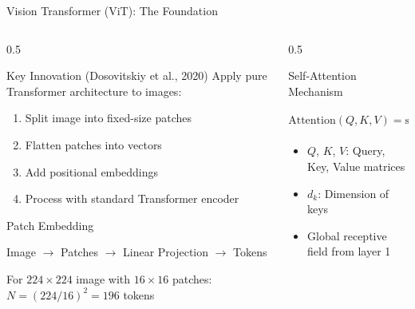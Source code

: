 \documentclass[aspectratio=169]{beamer}
\begin{document}
\begin{frame}{Vision Transformer (ViT): The Foundation}
    \begin{columns}
        \begin{column}{0.5\textwidth}
            \begin{block}{Key Innovation (Dosovitskiy et al., 2020)}
                Apply pure Transformer architecture to images:
                \begin{enumerate}
                    \item Split image into fixed-size patches
                    \item Flatten patches into vectors
                    \item Add positional embeddings
                    \item Process with standard Transformer encoder
                \end{enumerate}
            \end{block}
            
            \begin{block}{Patch Embedding}
                \begin{center}
                    Image $\rightarrow$ Patches $\rightarrow$ Linear Projection $\rightarrow$ Tokens
                \end{center}
                For $224 \times 224$ image with $16 \times 16$ patches: \\
                $N = (224/16)^2 = 196$ tokens
            \end{block}
        \end{column}
        \begin{column}{0.5\textwidth}
            \begin{block}{Self-Attention Mechanism}
                \begin{center}
                    $\text{Attention}(Q, K, V) = \text{softmax}\left(\frac{QK^T}{\sqrt{d_k}}\right)V$
                \end{center}
                \begin{itemize}
                    \item $Q$, $K$, $V$: Query, Key, Value matrices
                    \item $d_k$: Dimension of keys
                    \item Global receptive field from layer 1
                \end{itemize}
            \end{block}
            

\end{column}
\end{columns}
\end{frame}
\end{document}
